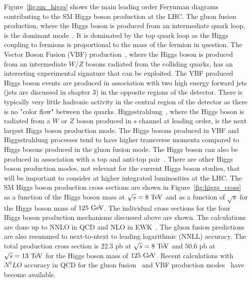 Figure~\ref{fig:sm_higgs} shows the main leading order Ferynman diagrams contributing to the SM Higgs boson production at the LHC. The gluon fusion production, where the Higgs boson is produced from an intermediate quark loop, is the dominant mode~\cite{Georgi:1977gs}. It is dominated by the top quark loop as the Higgs coupling to fermions is proportional to the mass of the fermion in question. The Vector Boson Fusion (VBF) production~\cite{Cahn:1983ip}, where the Higgs boson is produced from an intermediate $W/Z$ bosons radiated from the colliding quarks, has an interesting experimental signature that can be exploited.  The VBF produced Higgs boson events are produced in association with two high energy forward jets (jets are discussed in chapter $3$) in the opposite regions of the detector.  There is typically very little hadronic activity in the central region of the detector as there is no "color flow" between the quarks. Higgsstrahlung~\cite{Glashow:1978ab}, where the Higgs boson is radiated from a $W$ or $Z$ boson produced in $s$ channel at leading order, is the next largest Higgs boson production mode.  The Higgs bosons produced in VBF and Higgsstrahlung processes tend to have higher transverse momenta compared to Higgs bosons produced in the gluon fusion mode. The Higgs boson can also be produced in association with a top and anti-top pair~\cite{Raitio:1978pt,Ng:1983jm,Kunszt:1984ri,Marciano:1991qq}. There are other Higgs boson production modes, not relevant for the current Higgs boson studies, that will be important to consider at higher integrated luminosities at the LHC. The SM Higgs boson production cross sections are shown in Figure~\ref{fig:higgs_cross} as a function of the Higgs boson mass at $\sqrt{s}=8~\mathrm{Te\kern -0.1em V}$ and as a function of $\sqrt{s}$ for the Higgs boson mass of $125~\mathrm{Ge\kern -0.1em V}$. The individual cross sections for the four Higgs boson production mechanisms discussed above are shown. The calculations are done up to NNLO in QCD and NLO in EWK~\cite{Dittmaier:2011ti,Dittmaier:2012vm,Heinemeyer:2013tqa}. The gluon fusion predictions are also resummed to next-to-ntext to leading logarithmic (NNLL) accuracy. The total production cross section is $22.3$ pb at $\sqrt{s}=8~\mathrm{Te\kern -0.1em V}$ and $50.6$ pb at $\sqrt{s}=13~\mathrm{Te\kern -0.1em V}$ for the Higgs boson mass of $125~\mathrm{Ge\kern -0.1em V}$.  Recent calculations with $N^{3}LO$ accuracy in QCD for the gluon fusion~\cite{Anastasiou:2016cez} and VBF production modes~\cite{Dreyer:2016oyx} have become available. 

